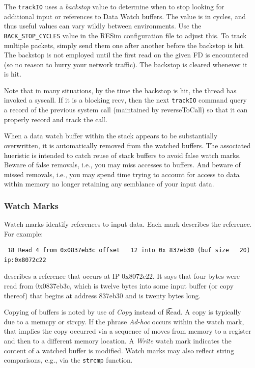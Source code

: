 \documentclass[titlepage]{article}
\begin{document}
The {\tt trackIO} uses a \textit{backstop} value to determine when to stop looking for additional input or references to Data Watch buffers.  The value is in 
cycles, and thus useful values can vary wildly between environments.  Use the {\tt BACK\_STOP\_CYCLES} value in the RESim configuration file to adjust this.
To track multiple packets, simply send them one after another before the backstop is hit.  The backstop is not employed until the first read on the given
FD is encountered (so no reason to hurry your network traffic).  The backstop is cleared whenever it is hit. 

Note that in many situations, by the time the backstop is hit, the thread has invoked a syscall.  If it is a blocking recv, then the next {\tt trackIO} 
command query a record of the previous system call (maintained by reverseToCall) so that it can properly record and track the call.

When a data watch buffer within the stack appears to be substantially overwritten, it is automatically removed from the watched buffers.
The associated hueristic is intended to catch reuse of stack buffers to avoid false watch marks.  Beware of false removals, i.e., you
may miss accesses to buffers.  And beware of missed removals, i.e., you may spend time trying to account for access to data within memory
no longer retaining any semblance of your input data.



\subsubsection{Watch Marks}
Watch marks identify references to input data.  Each mark describes the reference.  For example:

\begin{verbatim}
 18 Read 4 from 0x0837eb3c offset   12 into 0x 837eb30 (buf size   20)   ip:0x8072c22
\end{verbatim}
\noindent describes a reference that occurs at IP 0x8072c22.  It says that four bytes were read from 0x0837eb3c, which is twelve bytes into some input buffer
(or copy thereof) that begins at address 837eb30 and is twenty bytes long.

Copying of buffers is noted by use of \textit{Copy} instead of \t{Read}.  A copy is typically due to a memcpy or strcpy.  If the phrase \textit{Ad-hoc} occurs
within the watch mark, that implies the copy occurred via a sequence of moves from memory to a register and then to a different memory location.
A \textit{Write} watch mark indicates the content of a watched buffer is modified.  Watch marks may also reflect string comparisons, e.g., via the {\tt strcmp}
function.
\end{document}
